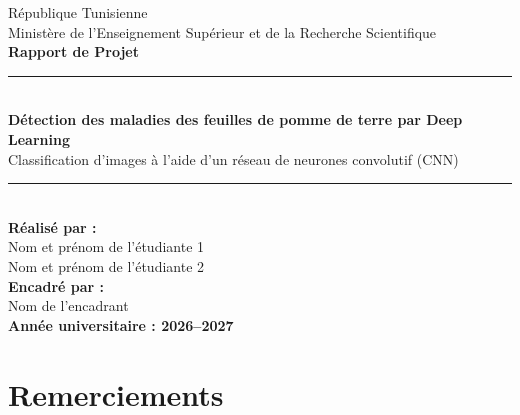 \documentclass[12pt,a4paper,oneside]{report}
\begin{document}

\begin{titlepage}
\begin{center}

{\Large République Tunisienne}\\[0.3cm]

{\large Ministère de l'Enseignement Supérieur
et de la Recherche Scientifique}\\[1cm]

{\Large \textbf{Rapport de Projet}}\\[1cm]

\rule{\textwidth}{1pt}\\[0.4cm]

{\Huge \textbf{Détection des maladies des feuilles
de pomme de terre par Deep Learning}}\\[0.4cm]

{\Large Classification d'images à l'aide d'un
réseau de neurones convolutif (CNN)}\\[0.4cm]

\rule{\textwidth}{1pt}\\[1cm]


\textbf{Réalisé par :}\\[0.2cm]
Nom et prénom de l'étudiante 1\\
Nom et prénom de l'étudiante 2\\[0.6cm]

\textbf{Encadré par :}\\
Nom de l'encadrant\\[1cm]

\textbf{Année universitaire : 2026--2027}

\end{center}
\end{titlepage}



\chapter*{Remerciements}
\end{document}
